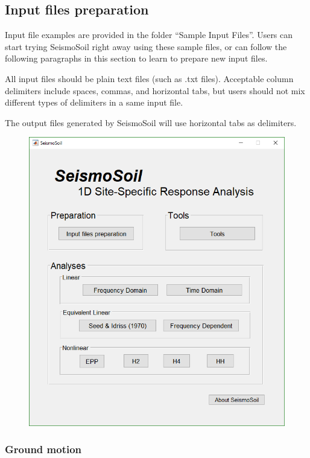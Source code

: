 \documentclass[11pt,letterpaper]{article}
\begin{document}
\subsection{Input files preparation}

Input file examples are provided in the folder ``Sample Input Files''. Users can start trying SeismoSoil right away using these sample files, or can follow the following paragraphs in this section to learn to prepare new input files.

All input files should be plain text files (such as \textsf{.txt} files). Acceptable column delimiters include spaces, commas, and horizontal tabs, but users should not mix different types of delimiters in a same input file.

The output files generated by SeismoSoil will use horizontal tabs as delimiters.

\begin{figure}[H]
\centering
  \includegraphics[width=.9\textwidth]{main.png}\\
\end{figure}

\newpage
\subsubsection{Ground motion}\label{sec:motion_file}
\end{document}
